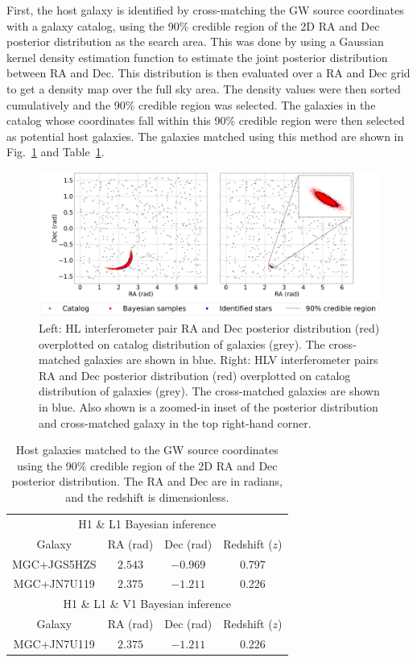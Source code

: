 \documentclass[11pt,a4paper]{article}
\begin{document}
First, the host galaxy is identified by cross-matching the GW source coordinates with a galaxy catalog, using the 90\% credible region of the 2D RA and Dec posterior distribution as the search area. This was done by using a Gaussian kernel density estimation function to estimate the joint posterior distribution between RA and Dec. This distribution is then evaluated over a RA and Dec grid to get a density map over the full sky area. The density values were then sorted cumulatively and the 90\% credible region was selected. The galaxies in the catalog whose coordinates fall within this 90\% credible region were then selected as potential host galaxies. The galaxies matched using this method are shown in Fig.~\ref{fig:matched_galaxies} and Table~\ref{tab:galaxies}.

\begin{figure}[h]
    \includegraphics[width=\columnwidth, keepaspectratio]{../figures/kde_crossmatch.png}
    \caption{Left: HL interferometer pair RA and Dec posterior distribution (red) overplotted on catalog distribution of galaxies (grey). The cross-matched galaxies are shown in blue. Right: HLV interferometer pairs RA and Dec posterior distribution (red) overplotted on catalog distribution of galaxies (grey). The cross-matched galaxies are shown in blue. Also shown is a zoomed-in inset of the posterior distribution and cross-matched galaxy in the top right-hand corner.}
    \label{fig:matched_galaxies}
\end{figure}

\begin{table}[h]
    \centering
    \begin{tabular}{c|c|c|c}
    \multicolumn{4}{c}{H1 \& L1 Bayesian inference} \\
    Galaxy & RA (rad) & Dec (rad) & Redshift ($z$) \\
    \hline
    MGC+JGS5HZS & $2.543$ & $-0.969$ & 0.797 \\
    MGC+JN7U119 & $2.375$ & $-1.211$ & 0.226 \\
    \hline
    \multicolumn{4}{c}{H1 \& L1 \& V1 Bayesian inference} \\
    Galaxy & RA (rad) & Dec (rad) & Redshift ($z$) \\
    \hline
    MGC+JN7U119 & $2.375$ & $-1.211$ & 0.226 \\
    \end{tabular}
    \caption{Host galaxies matched to the GW source coordinates using the 90\% credible region of the 2D RA and Dec posterior distribution. The RA and Dec are in radians, and the redshift is dimensionless.}
    \label{tab:galaxies}
\end{table}
\end{document}
